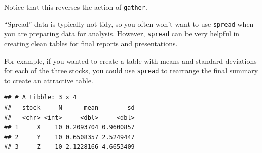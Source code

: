 \documentclass[]{book}
\makeatletter
\newenvironment{Shaded}{\begin{snugshade}}{\end{snugshade}}
\newcommand{\KeywordTok}[1]{\textcolor[rgb]{0.13,0.29,0.53}{\textbf{#1}}}
\newcommand{\DataTypeTok}[1]{\textcolor[rgb]{0.13,0.29,0.53}{#1}}
\newcommand{\DecValTok}[1]{\textcolor[rgb]{0.00,0.00,0.81}{#1}}
\newcommand{\StringTok}[1]{\textcolor[rgb]{0.31,0.60,0.02}{#1}}
\newcommand{\OperatorTok}[1]{\textcolor[rgb]{0.81,0.36,0.00}{\textbf{#1}}}
\newcommand{\NormalTok}[1]{#1}
\newenvironment{kframe}{%
\medskip{}
\setlength{\fboxsep}{.8em}
 \def\at@end@of@kframe{}%
 \ifinner\ifhmode%
  \def\at@end@of@kframe{\end{minipage}}%
  \begin{minipage}{\columnwidth}%
 \fi\fi%
 \def\FrameCommand##1{\hskip\@totalleftmargin \hskip-\fboxsep
 \colorbox{shadecolor}{##1}\hskip-\fboxsep
     \hskip-\linewidth \hskip-\@totalleftmargin \hskip\columnwidth}%
 \MakeFramed {\advance\hsize-\width
   \@totalleftmargin\z@ \linewidth\hsize
   \@setminipage}}%
 {\par\unskip\endMakeFramed%
 \at@end@of@kframe}
\renewenvironment{Shaded}{\begin{kframe}}{\end{kframe}}
\theoremstyle{definition}
\theoremstyle{definition}
\theoremstyle{definition}
\theoremstyle{remark}
\makeatother
\begin{document}
Notice that this reverses the action of \texttt{gather}.

``Spread'' data is typically not tidy, so you often won't want to use
\texttt{spread} when you are preparing data for analysis. However,
\texttt{spread} can be very helpful in creating clean tables for final
reports and presentations.

For example, if you wanted to create a table with means and standard
deviations for each of the three stocks, you could use \texttt{spread}
to rearrange the final summary to create an attractive table.

\begin{Shaded}
\end{Shaded}

\begin{verbatim}
## # A tibble: 3 x 4
##   stock     N      mean        sd
##   <chr> <int>     <dbl>     <dbl>
## 1     X    10 0.2093704 0.9600857
## 2     Y    10 0.6508357 2.5249447
## 3     Z    10 2.1228166 4.6653409
\end{verbatim}

\begin{Shaded}
\end{Shaded}
\end{document}
